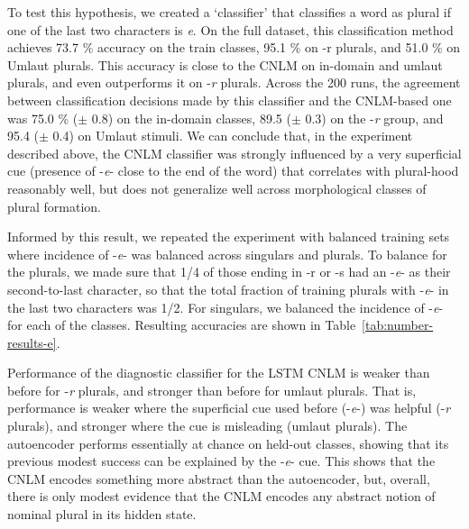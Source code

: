 To test this hypothesis, we created a `classifier' that classifies a word as plural if one of the last two characters is \emph{e}.
On the full dataset, this classification method achieves 73.7 \% accuracy on the train classes, 95.1 \% on -r plurals, and 51.0 \% on Umlaut plurals.
This accuracy is close to the CNLM on in-domain and umlaut plurals, and even outperforms it on -\emph{r} plurals.
Across the 200 runs, the agreement between classification decisions made by this classifier and the CNLM-based one was 75.0 \% ($\pm$ 0.8) on the in-domain classes,  89.5 ($\pm$ 0.3) on the -\emph{r} group, and 95.4 ($\pm$ 0.4) on Umlaut stimuli.
We can conclude that, in the experiment described above, the CNLM classifier was strongly influenced by a very superficial cue (presence of -\emph{e}- close to the end of the word) that correlates with plural-hood reasonably well, but does not generalize well across morphological classes of plural formation.



Informed by this result, we repeated the experiment with balanced training sets where incidence of -\emph{e}- was balanced across singulars and plurals.
To balance for the plurals, we made sure that 1/4 of those ending in -r or -s had an -\emph{e}- as their second-to-last character, so that the total fraction of training plurals with -\emph{e}- in the last two characters was 1/2.
For singulars, we balanced the incidence of -\emph{e}- for each of the classes.
Resulting accuracies are shown in Table~\ref{tab:number-results-e}.

Performance of the diagnostic classifier for the LSTM CNLM is weaker than before for -\emph{r} plurals, and stronger than before for umlaut plurals.
That is, performance is weaker where the superficial cue used before (-\emph{e}-) was helpful (-\emph{r} plurals), and stronger where the cue is misleading (umlaut plurals).
The autoencoder performs essentially at chance on held-out classes, showing that its previous modest success can be explained by the -\emph{e}- cue.
This shows that the CNLM encodes something more abstract than the autoencoder, but, overall, there is only modest evidence that the CNLM encodes any abstract notion of nominal plural in its hidden state.



